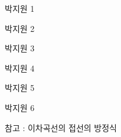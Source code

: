 \documentclass[twocolumn]{oblivoir}
\begin{document}
\everymath{\displaystyle}
\plotanswer

\begin{answer}{박지원 1}
\jiwon[1]
\end{answer}

\begin{answer}{박지원 2}
\jiwon[2]
\end{answer}


\begin{answer}{박지원 3}
\jiwon[3]
\end{answer}

\begin{answer}{박지원 4}
\jiwon[4]
\end{answer}


\begin{answer}{박지원 5}
\jiwon[5]
\end{answer}


\begin{answer}{박지원 6}
\jiwon[6]
\end{answer}

\begin{remark}{참고 : 이차곡선의 접선의 방정식}
\jiwon[1]
\end{remark}
\end{document}
